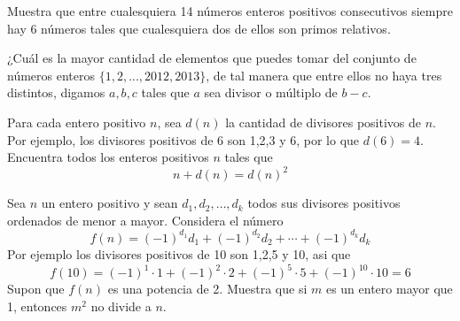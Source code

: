 \documentclass[11pt]{scrartcl}
\begin{document}
\begin{problem}
[2012/3]Muestra que entre cualesquiera 14 números enteros positivos consecutivos siempre hay 6 números tales que cualesquiera dos de ellos son primos relativos.
\end{problem}
\begin{problem}
[2013/3]¿Cuál es la mayor cantidad de elementos que puedes tomar del conjunto de números enteros $\{1, 2, ..., 2012, 2013\}$, de tal manera que entre ellos no haya tres distintos, digamos $a, b, c$ tales que $a$ sea divisor o múltiplo de $b-c$.
\end{problem}

\begin{problem}
[2014/6] Para cada entero positivo $n$, sea $d(n)$ la cantidad de divisores positivos de $n$. Por ejemplo, los divisores positivos de 6 son 1,2,3 y 6, por lo que $d(6)=4$. Encuentra todos los enteros positivos $n$ tales que 
$$n+d(n)=d(n)^2$$
\end{problem}

\begin{problem}
[ 2015/6] Sea $n$ un entero positivo y sean $d_1,d_2,\ldots, d_k$ todos sus divisores positivos ordenados de menor a mayor. Considera el número 
$$f(n)=(-1)^{d_1}d_1+(-1)^{d_2}d_2+\cdots+(-1)^{d_k}d_k$$
Por ejemplo los divisores positivos de 10 son 1,2,5 y 10, asi que 
$$f(10)=(-1)^1\cdot 1+(-1)^2 \cdot 2+(-1)^5\cdot 5 +(-1)^10\cdot 10=6$$
Supon que $f(n)$ es una potencia de 2. Muestra que si $m$ es un entero mayor que 1, entonces $m^2$ no divide a $n$.
\end{problem}
\end{document}
